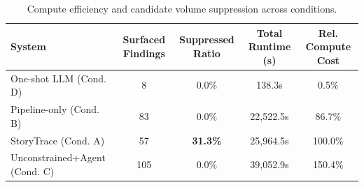 \begin{table}[h]
\centering
\begin{tabular}{lcccc}
\hline
System & Surfaced Findings & Suppressed Ratio & Total Runtime (s) & Rel. Compute Cost \\
\hline
One-shot LLM (Cond. D) & 8 & 0.0\% & 138.3s & 0.5\% \\
Pipeline-only (Cond. B) & 83 & 0.0\% & 22,522.5s & 86.7\% \\
StoryTrace (Cond. A) & 57 & \textbf{31.3\%} & 25,964.5s & 100.0\% \\
Unconstrained+Agent (Cond. C) & 105 & 0.0\% & 39,052.9s & 150.4\% \\
\hline
\end{tabular}
\caption{Compute efficiency and candidate volume suppression across conditions.}
\label{tab:cost-efficiency}
\end{table}

